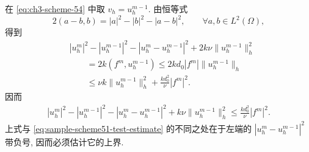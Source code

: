 {\begin{Proof}
在 \eqref{eq:ch3-scheme-54} 中取 $v_h=u_h^{m-1}$. 由恒等式
\begin{equation}
2(a-b,b)=|a|^2-|b|^2-|a-b|^2,
\qquad\forall a,b\in L^2(\Omega),
\label{eq:ch3-scheme-54-polarization-identity}
\end{equation}
得到
\begin{align*}
&|u_h^m|^2-|u_h^{m-1}|^2-|u_h^m-u_h^{m-1}|^2
+2k\nu\lVert u_h^{m-1}\rVert_h^2\\
&\qquad=2k(f^m,u_h^{m-1})
\leq2kd_0|f^m|\lVert u_h^{m-1}\rVert_h\\
&\qquad\leq\nu k\lVert u_h^{m-1}\rVert_h^2
+\frac{kd_0^2}{\nu}|f^m|^2.
\end{align*}
因而
\begin{align}
|u_h^m|^2-|u_h^{m-1}|^2-|u_h^m-u_h^{m-1}|^2
+k\nu\lVert u_h^{m-1}\rVert_h^2
\leq\frac{kd_0^2}{\nu}|f^m|^2.
\label{eq:ch3-scheme-54-preliminary-energy}
\end{align}
上式与 \eqref{eq:sample-scheme51-test-estimate} 的不同之处在于左端的 $|u_h^m-u_h^{m-1}|^2$ 带负号, 因而必须估计它的上界.


\end{Proof}}
